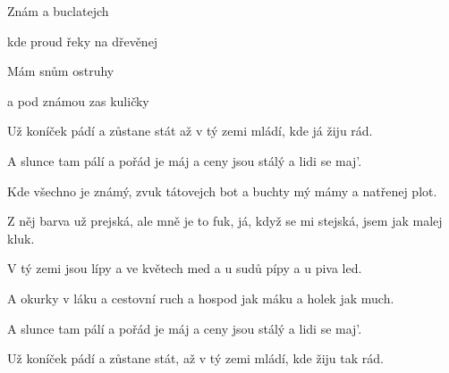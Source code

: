 

\zs
Znám   a buclatejch 

kde proud řeky  na dřevěnej 

Mám   snům ostruhy 

a pod známou  zas kuličky 
\ks

\zr
Už koníček pádí a zůstane stát až v tý zemi mládí, kde já žiju rád.

A slunce tam pálí a pořád je máj a ceny jsou stálý a lidi se maj'.
\kr

\zs
Kde všechno je známý, zvuk tátovejch bot a buchty mý mámy a natřenej plot.

Z něj barva už prejská, ale mně je to fuk, já, když se mi stejská, jsem jak malej kluk.
\ks

\zr\kr

\zs
V tý zemi jsou lípy a ve květech med a u sudů pípy a u piva led.

A okurky v láku a cestovní ruch a hospod jak máku a holek jak much.
\ks

\zr
A slunce tam pálí a pořád je máj a ceny jsou stálý a lidi se maj'.

Už koníček pádí a zůstane stát, až v tý zemi mládí, kde žiju tak rád.
\kr

\kp
